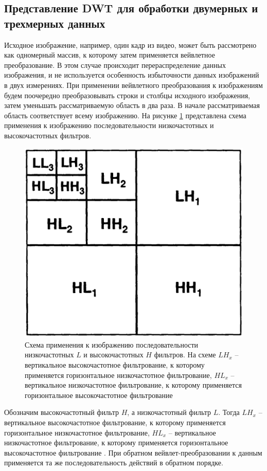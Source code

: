 \subsection{Представление DWT для обработки двумерных и трехмерных данных}
Исходное изображение, например, один кадр из видео, может быть рассмотрено как одномерный массив, 
к которому затем применяется вейвлетное преобразование. 
В этом случае происходит перераспределение данных изображения, и не используется особенность избыточности данных изображений в двух измерениях. 
При применении вейвлетного преобразования к изображениям будем поочередно преобразовывать 
строки и столбцы исходного изображения, затем уменьшать рассматриваемую область в два раза. 
В начале рассматриваемая область соответствует всему изображению.
На рисунке \ref{fig:schema} представлена схема применения к изображению последовательности низкочастотных и высокочастотных фильтров. 
\begin{figure}[ht]
  \centering
  \includegraphics[scale=0.5]{inc/graphics/schema.png}
  \caption{Схема применения к изображению последовательности низкочастотных $L$ и высокочастотных $H$ фильтров. 
  На схеме $LH_{x}$ – вертикальное высокочастотное фильтрование, к которому применяется горизонтальное 
  низкочастотное фильтрование, $HL_{x}$ – вертикальное низкочастотное фильтрование, 
  к которому применяется горизонтальное высокочастотное фильтрование}
  \label{fig:schema}
\end{figure}
Обозначим высокочастотный фильтр $H$, а низкочастотный фильтр $L$. Тогда $LH_{x}$ – 
вертикальное высокочастотное фильтрование, к которому применяется горизонтальное 
низкочастотное фильтрование, $HL_{x}$ – вертикальное низкочастотное фильтрование, 
к которому применяется горизонтальное высокочастотное фильтрование \cite{Pup03}.
При обратном вейвлет-преобразовании к данным применяется та же последовательность действий в обратном порядке.

